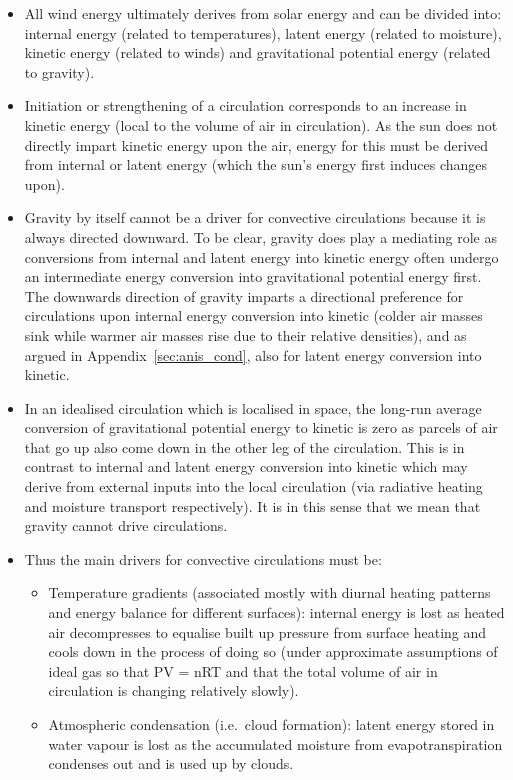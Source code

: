 \begin{itemize}
	\item All wind energy ultimately derives from solar energy and can be divided into: internal energy (related to temperatures), latent energy (related to moisture), kinetic energy (related to winds) and gravitational potential energy (related to gravity).
	\item Initiation or strengthening of a circulation corresponds to an increase in kinetic energy (local to the volume of air in circulation). As the sun does not directly impart kinetic energy upon the air, energy for this must be derived from internal or latent energy (which the sun’s energy first induces changes upon).
	\item Gravity by itself cannot be a driver for convective circulations because it is always directed downward. To be clear, gravity does play a mediating role as conversions from internal and latent energy into kinetic energy often undergo an intermediate energy conversion into gravitational potential energy first. The downwards direction of gravity imparts a directional preference for circulations upon internal energy conversion into kinetic (colder air masses sink while warmer air masses rise due to their relative densities), and as argued in Appendix~\ref{sec:anis_cond}, also for latent energy conversion into kinetic.
	\item In an idealised circulation which is localised in space, the long-run average conversion of gravitational potential energy to kinetic is zero as parcels of air that go up also come down in the other leg of the circulation. This is in contrast to internal and latent energy conversion into kinetic which may derive from external inputs into the local circulation (via radiative heating and moisture transport respectively). It is in this sense that we mean that gravity cannot drive circulations.
	\item Thus the main drivers for convective circulations must be:
	\begin{itemize}
		\item Temperature gradients (associated mostly with diurnal heating patterns and energy balance for different surfaces): internal energy is lost as heated air decompresses to equalise built up pressure from surface heating and cools down in the process of doing so (under approximate assumptions of ideal gas so that PV = nRT and that the total volume of air in circulation is changing relatively slowly).
		\item Atmospheric condensation (i.e.\ cloud formation): latent energy stored in water vapour is lost as the accumulated moisture from evapotranspiration condenses out and is used up by clouds.

\end{itemize}
\end{itemize}
